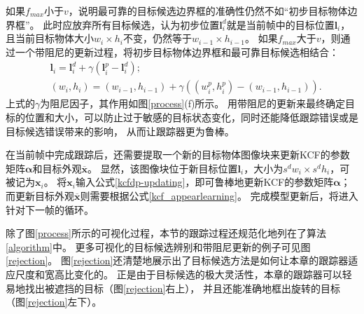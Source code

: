 如果$f_{max}$小于$v$，说明最可靠的目标候选边界框的准确性仍然不如``初步目标物体边界框''。
此时应放弃所有目标候选，认为初步位置$\mathbf{l}^d_i$就是当前帧中的目标位置$\mathbf{l}_i$，
且当前目标物体大小$w_i\times h_i$不变，仍然等于$w_{i-1}\times h_{i-1}$。
如果$f_{max}$大于$v$，则通过一个带阻尼的更新过程，将初步目标物体边界框和最可靠目标候选相结合：
\begin{equation}
\begin{aligned}
	&\mathbf{l}_i=\mathbf{l}^d_i+\gamma(\mathbf{l}^p_i-\mathbf{l}^d_i);\\ 
	&(w_i, h_i)=(w_{i-1},h_{i-1})+\gamma((w^p_i, h^p_i)-(w_{i-1},h_{i-1})). \label{kcfdp-damping}
\end{aligned}
\end{equation}
上式的$\gamma$为阻尼因子，其作用如图\ref{process}(f)所示。
用带阻尼的更新来最终确定目标的位置和大小，可以防止过于敏感的目标状态变化，同时还能降低跟踪错误或是目标候选错误带来的影响，
从而让跟踪器更为鲁棒。

在当前帧中完成跟踪后，还需要提取一个新的目标物体图像块来更新KCF的参数矩阵$\boldsymbol{\alpha}$和目标外观$\overline{\mathbf{x}}$。
显然，该图像块位于新目标位置$\mathbf{l}_i$，大小为$s^dw_i\times s^dh_i$，可被记为$\mathbf{x}_i$。
将$\mathbf{x}_i$输入公式\ref{kcfdp-updating}，即可鲁棒地更新KCF的参数矩阵$\boldsymbol{\alpha}$；
而更新目标外观$\overline{\mathbf{x}}$则需要根据公式\ref{kcf_appearlearning}。
完成模型更新后，将进入针对下一帧的循环。

除了图\ref{process}所示的可视化过程，本节的跟踪过程还规范化地列在了算法\ref{algorithm}中。
更多可视化的目标候选辨别和带阻尼更新的例子可见图\ref{rejection}。
图\ref{rejection}还清楚地展示出了目标候选方法是如何让本章的跟踪器适应尺度和宽高比变化的。
正是由于目标候选的极大灵活性，本章的跟踪器可以轻易地找出被遮挡的目标（图\ref{rejection}右上），
并且还能准确地框出旋转的目标（图\ref{rejection}左下）。

